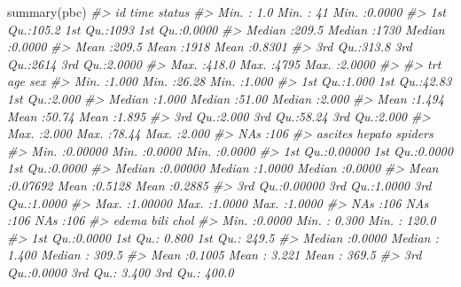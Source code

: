 \documentclass[
]{memoir}
\newenvironment{Shaded}{\begin{snugshade}}{\end{snugshade}}
\newcommand{\CommentTok}[1]{\textcolor[rgb]{0.56,0.35,0.01}{\textit{#1}}}
\newcommand{\FunctionTok}[1]{\textcolor[rgb]{0.00,0.00,0.00}{#1}}
\newcommand{\NormalTok}[1]{#1}
\begin{document}
\begin{Shaded}
\begin{Highlighting}[]
\FunctionTok{summary}\NormalTok{(pbc)}
\CommentTok{\#\textgreater{}        id             time          status      }
\CommentTok{\#\textgreater{}  Min.   :  1.0   Min.   :  41   Min.   :0.0000  }
\CommentTok{\#\textgreater{}  1st Qu.:105.2   1st Qu.:1093   1st Qu.:0.0000  }
\CommentTok{\#\textgreater{}  Median :209.5   Median :1730   Median :0.0000  }
\CommentTok{\#\textgreater{}  Mean   :209.5   Mean   :1918   Mean   :0.8301  }
\CommentTok{\#\textgreater{}  3rd Qu.:313.8   3rd Qu.:2614   3rd Qu.:2.0000  }
\CommentTok{\#\textgreater{}  Max.   :418.0   Max.   :4795   Max.   :2.0000  }
\CommentTok{\#\textgreater{}                                                 }
\CommentTok{\#\textgreater{}       trt             age             sex       }
\CommentTok{\#\textgreater{}  Min.   :1.000   Min.   :26.28   Min.   :1.000  }
\CommentTok{\#\textgreater{}  1st Qu.:1.000   1st Qu.:42.83   1st Qu.:2.000  }
\CommentTok{\#\textgreater{}  Median :1.000   Median :51.00   Median :2.000  }
\CommentTok{\#\textgreater{}  Mean   :1.494   Mean   :50.74   Mean   :1.895  }
\CommentTok{\#\textgreater{}  3rd Qu.:2.000   3rd Qu.:58.24   3rd Qu.:2.000  }
\CommentTok{\#\textgreater{}  Max.   :2.000   Max.   :78.44   Max.   :2.000  }
\CommentTok{\#\textgreater{}  NA\textquotesingle{}s   :106                                    }
\CommentTok{\#\textgreater{}     ascites            hepato          spiders      }
\CommentTok{\#\textgreater{}  Min.   :0.00000   Min.   :0.0000   Min.   :0.0000  }
\CommentTok{\#\textgreater{}  1st Qu.:0.00000   1st Qu.:0.0000   1st Qu.:0.0000  }
\CommentTok{\#\textgreater{}  Median :0.00000   Median :1.0000   Median :0.0000  }
\CommentTok{\#\textgreater{}  Mean   :0.07692   Mean   :0.5128   Mean   :0.2885  }
\CommentTok{\#\textgreater{}  3rd Qu.:0.00000   3rd Qu.:1.0000   3rd Qu.:1.0000  }
\CommentTok{\#\textgreater{}  Max.   :1.00000   Max.   :1.0000   Max.   :1.0000  }
\CommentTok{\#\textgreater{}  NA\textquotesingle{}s   :106       NA\textquotesingle{}s   :106      NA\textquotesingle{}s   :106     }
\CommentTok{\#\textgreater{}      edema             bili             chol       }
\CommentTok{\#\textgreater{}  Min.   :0.0000   Min.   : 0.300   Min.   : 120.0  }
\CommentTok{\#\textgreater{}  1st Qu.:0.0000   1st Qu.: 0.800   1st Qu.: 249.5  }
\CommentTok{\#\textgreater{}  Median :0.0000   Median : 1.400   Median : 309.5  }
\CommentTok{\#\textgreater{}  Mean   :0.1005   Mean   : 3.221   Mean   : 369.5  }
\CommentTok{\#\textgreater{}  3rd Qu.:0.0000   3rd Qu.: 3.400   3rd Qu.: 400.0  }

\end{Highlighting}
\end{Shaded}
\end{document}
